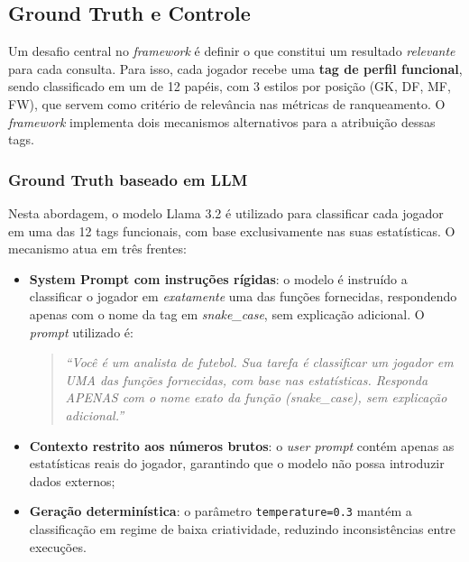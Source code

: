 \documentclass[portuguese]{sbc2025}
\begin{document}
\subsection{Ground Truth e Controle}
\label{subsec:grounding}

Um desafio central no \textit{framework} é definir o que constitui um resultado
\textit{relevante} para cada consulta. Para isso, cada jogador recebe uma
\textbf{tag de perfil funcional}, sendo classificado em um de 12 papéis, com 3 estilos
por posição (GK, DF, MF, FW), que servem como critério de relevância nas métricas de
ranqueamento. O \textit{framework} implementa dois mecanismos alternativos para a
atribuição dessas tags.

\subsubsection{Ground Truth baseado em LLM}
\label{subsubsec:gt_llm}

Nesta abordagem, o modelo Llama 3.2 é utilizado para classificar cada jogador em uma
das 12 tags funcionais, com base exclusivamente nas suas estatísticas. O mecanismo
atua em três frentes:

\begin{itemize}
  \item \textbf{System Prompt com instruções rígidas}: o modelo é instruído a
        classificar o jogador em \textit{exatamente} uma das funções fornecidas,
        respondendo apenas com o nome da tag em \textit{snake\_case}, sem
        explicação adicional. O \textit{prompt} utilizado é:
        \begin{quotation}
          \textit{``Você é um analista de futebol. Sua tarefa é classificar um
          jogador em UMA das funções fornecidas, com base nas estatísticas. Responda
          APENAS com o nome exato da função (snake\_case), sem explicação
          adicional.''}
        \end{quotation}

  \item \textbf{Contexto restrito aos números brutos}: o \textit{user prompt} contém
        apenas as estatísticas reais do jogador, garantindo que o modelo não possa
        introduzir dados externos;

  \item \textbf{Geração determinística}: o parâmetro \texttt{temperature=0.3}
        mantém a classificação em regime de baixa criatividade, reduzindo
        inconsistências entre execuções.
\end{itemize}
\end{document}
